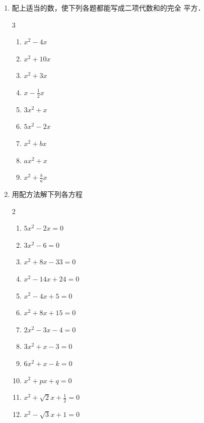 \begin{enumerate}
\item 配上适当的数，使下列各题都能写成二项代数和的完全
平方．
    \begin{multicols}{3}
        \begin{enumerate}
\item $x^2-4x$
\item $x^2+10x$
\item $x^2+3x$
\item $x-\frac{1}{2}x$
\item $3x^2+x$
\item $5x^2-2x$
\item $x^2+bx$
\item $ ax^2+x$
\item $x^2+\frac{b}{a}x$
\end{enumerate}
\end{multicols}
\item 用配方法解下列各方程
\begin{multicols}{2}
    \begin{enumerate}
\item $5x^2-2x=0$
\item $3x^2-6=0$
\item $x^2+8x-33=0$
\item $x^2-14x+24=0$
\item $x^2-4x+5=0$
\item $x^2+8x+15=0$
\item $2x^2-3x-4=0$
\item $3x^2+x-3=0$
\item $6x^2+x-k=0$
\item $x^2+px+q=0$
\item $x^2+\sqrt{2}x+\frac{1}{2}=0$
\item $x^2-\sqrt{3}x+1=0$
        \end{enumerate}
    \end{multicols}


\end{enumerate}
